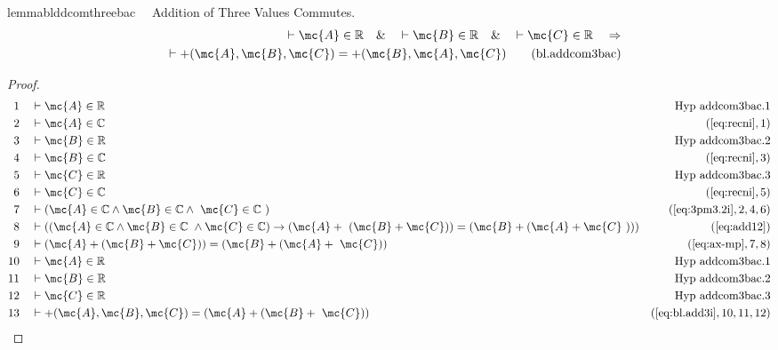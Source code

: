 \begin{restatable}{lemma}{blddcomthreebac}~~ Addition of Three Values Commutes.
\begin{align}
\vdash \mc{A} \in \mathbb{R}\quad\&\quad \vdash \mc{B} \in
    \mathbb{R}\quad\&\quad \vdash \mc{C} \in \mathbb{R}\quad\Rightarrow \notag \\ 
	\quad
    \vdash +( \mc{A} , \mc{B} , \mc{C} ) = +( \mc{B} , \mc{A} , \mc{C}
    )\label{eq:bl.addcom3bac}\tag{bl.addcom3bac}
\end{align}
\end{restatable}

\begin{proof}
\begin{align}
  1 &&  & \vdash \mc{A} \in
\mathbb{R}&\text{Hyp~addcom3bac.1}\notag%
  \\ 2 &&  & \vdash \mc{A} \in \mathbb{C}&(\mbox{\ref{eq:recni}},1)\notag
  \\ 3 &&  & \vdash \mc{B} \in
\mathbb{R}&\text{Hyp~addcom3bac.2}\notag%
  \\ 4 &&  & \vdash \mc{B} \in \mathbb{C}&(\mbox{\ref{eq:recni}},3)\notag
  \\ 5 &&  & \vdash \mc{C} \in
\mathbb{R}&\text{Hyp~addcom3bac.3}\notag%
  \\ 6 &&  & \vdash \mc{C} \in \mathbb{C}&(\mbox{\ref{eq:recni}},5)\notag
  \\ 7 &&  & \vdash ( \mc{A} \in \mathbb{C} \wedge \mc{B} \in \mathbb{C} \wedge
     ~\mc{C} \in \mathbb{C}
     ~)&(\mbox{\ref{eq:3pm3.2i}},2,4,6)\notag
  \\ 8 &&  & \vdash ( ( \mc{A} \in \mathbb{C} \wedge \mc{B} \in \mathbb{C}
     ~\wedge \mc{C} \in \mathbb{C} ) \rightarrow ( \mc{A} +
     ~( \mc{B} + \mc{C} ) ) = ( \mc{B} + ( \mc{A} + \mc{C}
     ~) ) )&(\mbox{\ref{eq:add12}})\notag
  \\ 9 &&  & \vdash ( \mc{A} + ( \mc{B} + \mc{C} ) ) = ( \mc{B} + ( \mc{A} +
     ~\mc{C} ) )&(\mbox{\ref{eq:ax-mp}},7,8)\notag
  \\ 10 &&  & \vdash \mc{A} \in
\mathbb{R}&\text{Hyp~addcom3bac.1}\notag%
  \\ 11 &&  & \vdash \mc{B} \in
\mathbb{R}&\text{Hyp~addcom3bac.2}\notag%
  \\ 12 &&  & \vdash \mc{C} \in
\mathbb{R}&\text{Hyp~addcom3bac.3}\notag%
  \\ 13 &&  & \vdash +( \mc{A} , \mc{B} , \mc{C} ) = ( \mc{A} + ( \mc{B} +
     ~\mc{C} ) )&(\mbox{\ref{eq:bl.add3i}},10,11,12)\notag

\end{align}
\end{proof}
